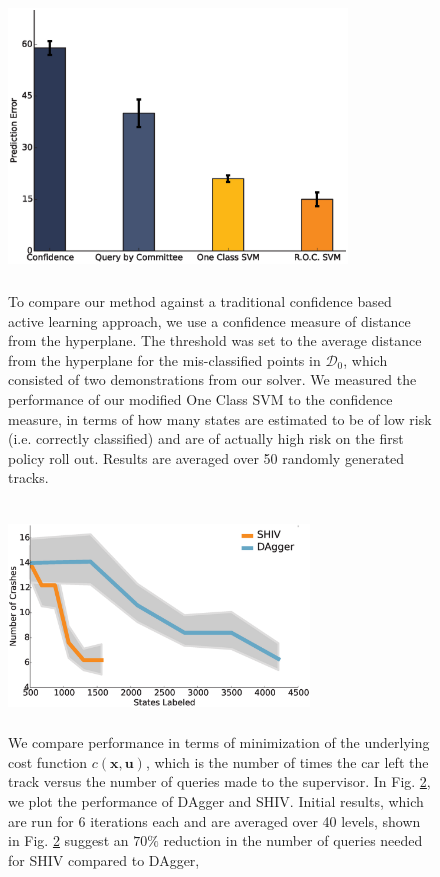 \documentclass[10pt, conference]{ieeeconf}      %
\newcommand{\bu}{\mathbf{u}}
\newcommand{\bx}{\mathbf{x}}
\begin{document}
\begin{figure}[t]
\centering
\includegraphics[width=9cm, height=8cm]{figures/risk_bar.eps}
   \caption { \footnotesize  To compare our method against a traditional confidence based active learning approach, we use a confidence measure  of distance from the hyperplane. The threshold was set to the average distance from the hyperplane for the mis-classified points in $\mathcal{D}_0$, which consisted of two demonstrations from our solver. We measured the performance of our modified One Class SVM to the confidence measure, in terms of how many states are estimated to be of low risk (i.e. correctly classified) and are of actually high risk on the first policy roll out. Results  are averaged over 50 randomly generated tracks. 
   }

\label{fig:active_comp}
\end{figure}



\begin{figure}[t!]
\centering
\includegraphics[width=8cm, height=6cm]{figures/dagger_shiv_one_class.eps}
\caption{We compare performance in terms of minimization of the underlying cost function $c(\bx,\bu)$, which is the  number of times the car left the track versus the number of queries made to the supervisor. In Fig. \ref{fig:car_cost}, we plot the performance of DAgger and SHIV.  Initial results, which are run for 6 iterations each and are averaged over 40 levels, shown in Fig. \ref{fig:car_cost} suggest an $70\%$ reduction in the number of queries needed for SHIV compared to DAgger,}
\vspace*{-10pt}
\label{fig:car_cost}
\end{figure}
\end{document}
